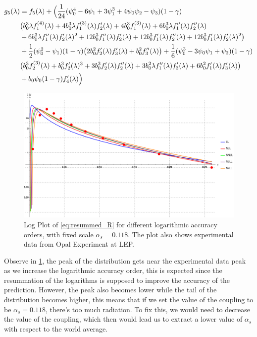 \documentclass[../main.tex]{subfiles}
\begin{document}
\begin{align}\label{eq:g5}
    \begin{split}
        g_5(\lambda) &=  f_5(\lambda) +  \Bigl(\frac{1}{24} (\psi_0^4 -6 \psi_1 + 3\psi_1^3 +4\psi_0\psi_2 -\psi_3)(1-\gamma) \\
        &\bigl(b_0^3 \lambda  f_1^{(4)}(\lambda ) +4 b_0^3 \lambda  f_1^{(3)}(\lambda ) f_2'(\lambda ) + 4 b_0^3 f_1^{(3)}(\lambda )+6 b_0^3 \lambda  f_1''(\lambda ) f_2''(\lambda ) \\
        &+ 6 b_0^3 \lambda  f_1''(\lambda ) f_2'(\lambda )^2 +12 b_0^3 f_1''(\lambda ) f_2'(\lambda )+12 b_0^3 f_1'(\lambda ) f_2''(\lambda ) + 12 b_0^3 f_1'(\lambda ) f_2'(\lambda )^2\bigr) \\
        &+ \frac{1}{2} (\psi_0^2-\psi_1)(1-\gamma) \bigl(2 b_0^2 f_2'(\lambda ) f_3'(\lambda )+b_0^2 f_3''(\lambda )\bigr) + \frac{1}{6} (\psi_0^3 -3 \psi_0\psi_1+\psi_2)(1-\gamma) \\
        &\bigl(b_0^3 f_2^{(3)}(\lambda )+b_0^3 f_2'(\lambda )^3 +3 b_0^3 f_2'(\lambda ) f_2''(\lambda )+3 b_0^2 \lambda  f_1''(\lambda ) f_3'(\lambda ) +6 b_0^2 f_1'(\lambda ) f_3'(\lambda )\bigr)\\
        &+ b_0 \psi_0(1-\gamma) f_4'(\lambda ) \Bigr)
    \end{split}
\end{align}

\begin{figure}[htbp]
    \centering
    \includegraphics[width=\textwidth]{figures/Thrust_differential_distribution.png}
    \caption{Log Plot of \cref{eq:resummed_R} for different logarithmic accuracy orders, with fixed scale $\alpha_s = 0.118$. 
    The plot also shows experimental data from Opal Experiment at LEP.}
    \label{fig:Thrust distribution with data}
\end{figure}

Observe in \cref{fig:Thrust distribution with data}, the peak of the distribution gets near the experimental data peak as we increase the logarithmic accuracy order,
this is expected since the resummation of the logarithms is supposed to improve the accuracy of the prediction.
However, the peak also becomes lower while the tail of the distribution becomes higher, this means that if we set the value of the coupling to be $\alpha_s=0.118$, there's 
too much radiation. To fix this, we would need to decrease the value of the coupling, which then would lead us to extract a lower value of $\alpha_s$ with respect to the world average. 
\end{document}

